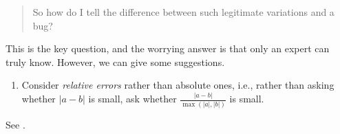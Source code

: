\begin{quote}
So how do I tell the difference between such legitimate variations and a bug?
\end{quote}
This is the key question, and the worrying answer is that only an expert can truly know. However, we can give some suggestions.
\begin{enumerate}
\item Consider \emph{relative errors} rather than absolute ones, i.e., rather than asking whether $|a-b|$ is small, ask whether $\frac{|a-b|}{\max(|a|,|b|)}$ is small.
\end{enumerate}


See \cite{Barba2016b}.
